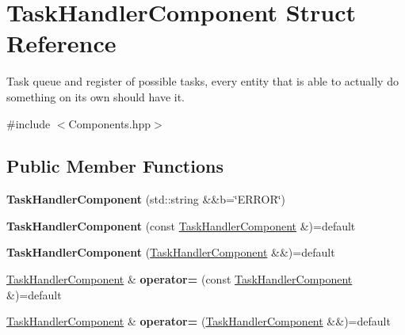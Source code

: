 \hypertarget{struct_task_handler_component}{}\section{Task\+Handler\+Component Struct Reference}
\label{struct_task_handler_component}


Task queue and register of possible tasks, every entity that is able to actually do something on it\textquotesingle{}s own should have it.  




{\ttfamily \#include $<$Components.\+hpp$>$}

\subsection*{Public Member Functions}
\begin{DoxyCompactItemize}
\item 
{\bfseries Task\+Handler\+Component} (std\+::string \&\&b=\char`\"{}E\+R\+R\+OR\char`\"{})\hypertarget{struct_task_handler_component_a6e2e537bd2a20dd39e82671725531647}{}\label{struct_task_handler_component_a6e2e537bd2a20dd39e82671725531647}

\item 
{\bfseries Task\+Handler\+Component} (const \hyperlink{struct_task_handler_component}{Task\+Handler\+Component} \&)=default\hypertarget{struct_task_handler_component_a90f2e87a272be1ad40912cb628c917aa}{}\label{struct_task_handler_component_a90f2e87a272be1ad40912cb628c917aa}

\item 
{\bfseries Task\+Handler\+Component} (\hyperlink{struct_task_handler_component}{Task\+Handler\+Component} \&\&)=default\hypertarget{struct_task_handler_component_a8578d55c4499bf925c7e5d35d7c774d4}{}\label{struct_task_handler_component_a8578d55c4499bf925c7e5d35d7c774d4}

\item 
\hyperlink{struct_task_handler_component}{Task\+Handler\+Component} \& {\bfseries operator=} (const \hyperlink{struct_task_handler_component}{Task\+Handler\+Component} \&)=default\hypertarget{struct_task_handler_component_aa4187b1d9fbba8bddae9be31be6c234a}{}\label{struct_task_handler_component_aa4187b1d9fbba8bddae9be31be6c234a}

\item 
\hyperlink{struct_task_handler_component}{Task\+Handler\+Component} \& {\bfseries operator=} (\hyperlink{struct_task_handler_component}{Task\+Handler\+Component} \&\&)=default\hypertarget{struct_task_handler_component_acdc159bc139d71cf2ce26c247520234f}{}\label{struct_task_handler_component_acdc159bc139d71cf2ce26c247520234f}

\end{DoxyCompactItemize}
